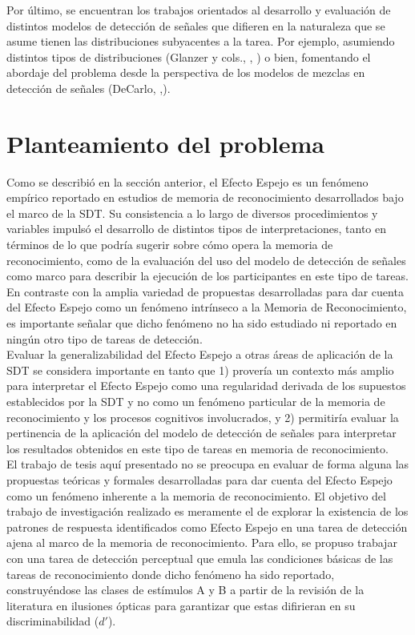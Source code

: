 Por último, se encuentran los trabajos orientados al desarrollo y evaluación de distintos modelos de detección de señales que difieren en la naturaleza que se asume tienen las distribuciones subyacentes a la tarea. Por ejemplo, asumiendo distintos tipos de distribuciones (Glanzer y cols., \citeyear{Glanzer1993}, \citeyear{Glanzer2009}) o bien, fomentando el abordaje del problema desde la perspectiva de los modelos de mezclas en detección de señales (DeCarlo, \citeyear{DeCarlo2002} ,\citeyear{DeCarlo2007}).\\

\section{Planteamiento del problema}

Como se describió en la sección anterior, el Efecto Espejo es un fenómeno empírico reportado en estudios de memoria de reconocimiento desarrollados bajo el marco de la SDT. Su consistencia a lo largo de diversos procedimientos y variables impulsó el desarrollo de distintos tipos de interpretaciones, tanto en términos de lo que podría sugerir sobre cómo opera la memoria de reconocimiento, como de la evaluación del uso del modelo de detección de señales como marco para describir la ejecución de los participantes en este tipo de tareas.\\

En contraste con la amplia variedad de propuestas desarrolladas para dar cuenta del Efecto Espejo como un fenómeno intrínseco a la Memoria de Reconocimiento, es importante señalar que dicho fenómeno no ha sido estudiado ni reportado en ningún otro tipo de tareas de detección.\\

Evaluar la generalizabilidad del Efecto Espejo a otras áreas de aplicación de la SDT se considera importante en tanto que 1) provería un contexto más amplio para interpretar el Efecto Espejo como una regularidad derivada de los supuestos establecidos por la SDT y no como un fenómeno particular de la memoria de reconocimiento y los procesos cognitivos involucrados, y 2) permitiría evaluar la pertinencia de la aplicación del modelo de detección de señales para interpretar los resultados obtenidos en este tipo de tareas en memoria de reconocimiento.\\

El trabajo de tesis aquí presentado no se preocupa en evaluar de forma alguna las propuestas teóricas y formales desarrolladas para dar cuenta del Efecto Espejo como un fenómeno inherente a la memoria de reconocimiento. El objetivo del trabajo de investigación realizado es meramente el de explorar la existencia de los patrones de respuesta identificados como Efecto Espejo en una tarea de detección ajena al marco de la memoria de reconocimiento. Para ello, se propuso trabajar con una tarea de detección perceptual que emula las condiciones básicas de las tareas de reconocimiento donde dicho fenómeno ha sido reportado, construyéndose las clases de estímulos A y B a partir de la revisión de la literatura en ilusiones ópticas para garantizar que estas difirieran en su discriminabilidad ($d'$).